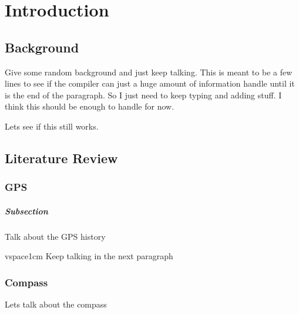 \chapter{Introduction}
\section{Background}
Give some random background and just keep talking. This is meant to be a few lines to
see if the compiler can just a huge amount of information handle
until it is the end of the paragraph. So I just need to keep typing and adding stuff.
I think this should be enough to handle for now.
\par
\par
\noindent
Lets see if this still works.
\section{Literature Review}
\subsection{GPS}
\paragraph{Subsection}
Talk about the GPS history
\par
vspace{1cm}
\noindent
Keep talking in the next paragraph
\subsection{Compass}
Lets talk about the compass

